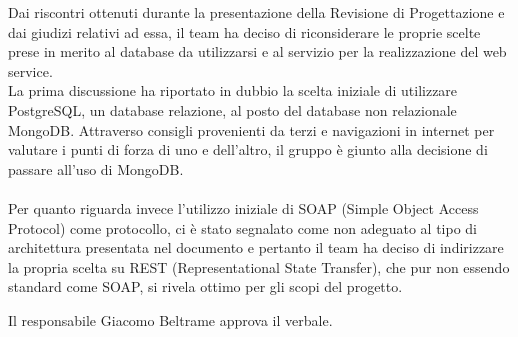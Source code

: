 \documentclass[a4paper]{article}
\def\RESPONSABILE{Giacomo Beltrame}
\begin{document}
Dai riscontri ottenuti durante la presentazione della Revisione di Progettazione e dai giudizi relativi ad essa, il team ha deciso di riconsiderare le proprie scelte prese in merito al database da utilizzarsi e al servizio per la realizzazione del web service.
\\ La prima discussione ha riportato in dubbio la scelta iniziale di utilizzare PostgreSQL, un database relazione, al posto del database non relazionale MongoDB. Attraverso consigli provenienti da terzi e navigazioni in internet per valutare i punti di forza di uno e dell'altro, il gruppo è giunto alla decisione di passare all'uso di MongoDB.
\\
\\ Per quanto riguarda invece l'utilizzo iniziale di SOAP (Simple Object Access Protocol) come protocollo, ci è stato segnalato come non adeguato al tipo di architettura presentata nel documento  e pertanto il team ha deciso di indirizzare la propria scelta su REST (Representational State Transfer), che pur non essendo standard come SOAP, si rivela ottimo per gli scopi del progetto.

\vspace{1cm}
Il responsabile \RESPONSABILE{} approva il verbale.
\end{document}
